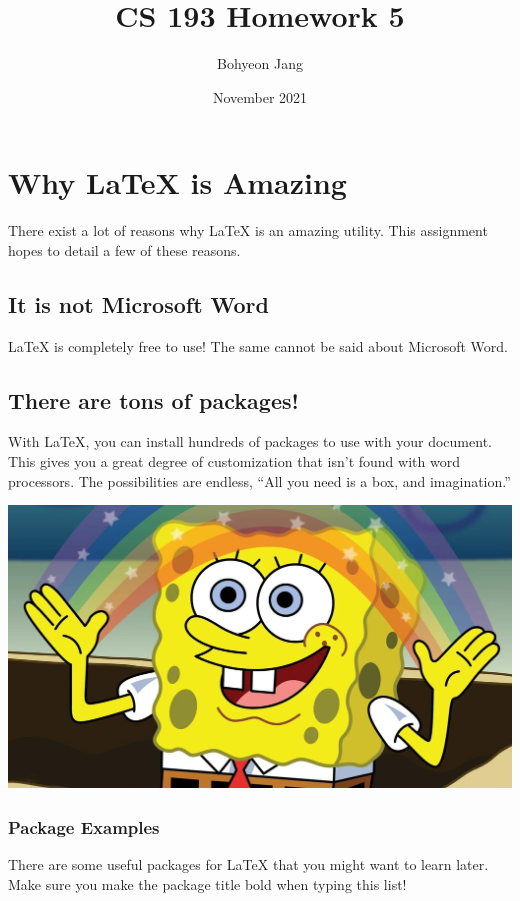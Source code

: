 \documentclass{article}
\title{CS 193 Homework 5}
\author{Bohyeon Jang}
\date{November 2021}
\begin{document}
\maketitle

\section{Why LaTeX is Amazing}
{There exist a lot of reasons why LaTeX is an amazing utility. This assignment hopes to detail a few of these reasons.}
\subsection{It is not Microsoft Word}
{LaTeX is completely free to use! The same cannot be said about Microsoft Word.}
\subsection{There are tons of packages!}
{With LaTeX, you can install hundreds of packages to use with your document. This gives you a great degree of customization that isn’t found with word processors. The possibilities are endless, “All you need is a box, and imagination.”}
\begin{center}
\includegraphics[scale=0.17]{imagination.png}
\end{center}
\subsubsection{Package Examples}
{There are some useful packages for LaTeX that you might want to learn later. Make sure you make the package title bold when typing this list!}


\end{document}
